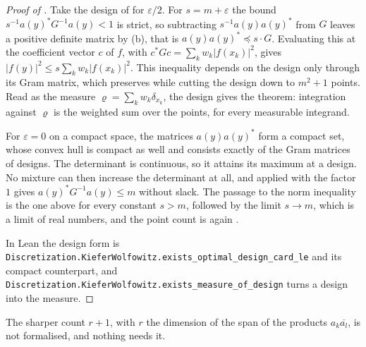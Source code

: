 \begin{proof}[Proof of ]
\leanok
{}
Take the design of  for $\varepsilon/2$. For
$s = m + \varepsilon$ the bound $s^{-1} a(y)^* G^{-1} a(y) < 1$ is strict, so subtracting
$s^{-1} a(y) a(y)^*$ from $G$ leaves a positive definite matrix by
(b), that is $a(y) a(y)^* \preceq s \cdot G$. Evaluating this at
the coefficient vector $c$ of $f$, with $c^* G c = \sum_k w_k |f(x_k)|^2$, gives
$|f(y)|^2 \leq s \sum_k w_k |f(x_k)|^2$. This inequality depends on the design only through
its Gram matrix, which  preserves while cutting the design down
to $m^2 + 1$ points. Read as the measure $\varrho = \sum_k w_k \delta_{x_k}$, the design
gives the theorem: integration against $\varrho$ is the weighted sum over the points, for
every measurable integrand.

For $\varepsilon = 0$ on a compact space, the matrices $a(y) a(y)^*$ form a compact set,
whose convex hull is compact as well and consists exactly of the Gram matrices of designs.
The determinant is continuous, so it attains its maximum at a design. No mixture can then
increase the determinant at all, and  applied with the factor $1$
gives $a(y)^* G^{-1} a(y) \leq m$ without slack. The passage to the norm inequality is the
one above for every constant $s > m$, followed by the limit $s \to m$, which is a limit of
real numbers, and the point count is again .

In Lean the design form is
\texttt{Discretization.KieferWolfowitz.exists\_optimal\_design\_card\_le} and its
compact counterpart, and
\texttt{Discretization.KieferWolfowitz.exists\_measure\_of\_design} turns a
design into the measure.
\end{proof}

\begin{remark}
\label{rem:point-count}
\leanok
{}
The sharper count
$r + 1$, with $r$ the dimension of the span of the products $a_k \overline{a_l}$, is not
formalised, and nothing needs it.
\end{remark}

